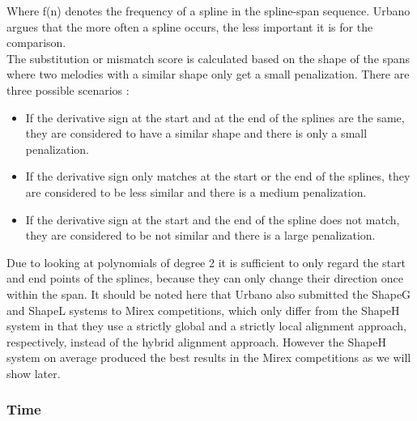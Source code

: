 \documentclass{llncs}
\begin{document}
        Where f(n) denotes the frequency of a spline in the spline-span sequence. Urbano argues that the more often a spline occurs, the less important it is for the comparison. \\
        The substitution or mismatch score is calculated based on the shape of the spans where two melodies with a similar shape only get a small penalization. There are three possible scenarios : 
        \begin{itemize}
         \item If the derivative sign at the start and at the end of the splines are the same, they are considered to have a similar shape and there is only a small penalization.
         \item If the derivative sign only matches at the start or the end of the splines, they are considered to be less similar and there is a medium penalization.
         \item If the derivative sign at the start and the end of the spline does not match, they are considered to be not similar and there is a large penalization.
        \end{itemize}
        Due to looking at polynomials of degree 2 it is sufficient to only regard the start and end points of the splines, because they can only change their direction once within the span.
        It should be noted here that Urbano also submitted the ShapeG and ShapeL systems to Mirex competitions, which only differ from the ShapeH system in that they use a strictly global and a strictly local alignment approach, respectively, instead of the hybrid alignment approach. However the ShapeH system on average produced the best results in the Mirex competitions as we will show later.
  
		
		\subsubsection{Time}
		
\end{document}
